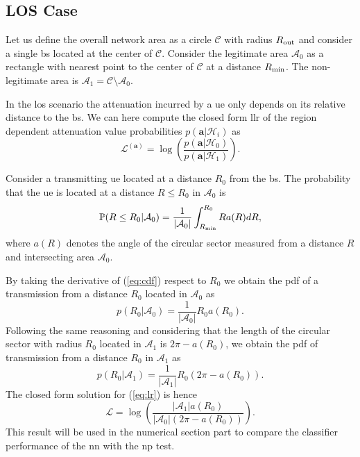\documentclass[twocolumns]{IEEEtran}
\begin{document}
\subsection{LOS Case}
Let us define the overall network area as a circle $\mathcal{C}$ with radius $R_{\rm out}$ and consider a single \ac{bs} located at the center of $\mathcal{C}$. Consider the legitimate area $\mathcal{A}_{0}$ as a rectangle with nearest point to the center of $\mathcal{C}$ at a distance $R_{\rm min}$. The non-legitimate area is $\mathcal{A}_1 = \mathcal{C} \setminus \mathcal{A}_0$.

In the \ac{los} scenario the attenuation incurred by a \ac{ue} only depends on its relative distance to the \ac{bs}. We can here compute the closed form \ac{llr} of the region dependent attenuation value probabilities $p(\bm{a}|\mathcal{H}_i)$ as
\begin{equation}\label{eq:lr}
    \mathcal{L}^{(\bm{a})}=\log\left(\frac{p(\bm{a}|\mathcal{H}_0)}{p(\bm{a}|\mathcal{H}_1)}\right).
\end{equation}

Consider a transmitting \ac{ue} located at a distance $R_0$ from the \ac{bs}. The probability that the \ac{ue} is located at a distance $R\le R_0$ in $\mathcal{A}_0$ is
\begin{equation}\label{eq:cdf}
     \mathbb{P}(R \le R_0|\mathcal{A}_0) = \frac{1}{|\mathcal{A}_0|}\int_{R_{\rm min}}^{R_0} R a(R) dR,
\end{equation}
where $a(R)$ denotes the angle of the circular sector measured from a distance $R$ and intersecting area $\mathcal{A}_0$.

By taking the derivative of (\ref{eq:cdf}) respect to $R_0$ we obtain the \ac{pdf} of a transmission from a distance $R_0$ located in $\mathcal{A}_0$ as
\begin{equation}
    p(R_0|\mathcal{A}_0) = \frac{1}{|\mathcal{A}_0|}R_0a(R_0).
\end{equation}
Following the same reasoning and considering that the length of the circular sector with radius $R_0$ located in $\mathcal{A}_1$ is $2\pi - a(R_0)$, we obtain the \ac{pdf} of transmission from a distance $R_0$ in $\mathcal{A}_1$ as
\begin{equation}
     p(R_0|\mathcal{A}_1) = \frac{1}{|\mathcal{A}_1|}R_0\left(2\pi-a(R_0)\right).
\end{equation}
The closed form solution for (\ref{eq:lr}) is hence
\begin{equation}
    \mathcal{L}=\log\left(\frac{|\mathcal{A}_1|a(R_0)}{|\mathcal{A}_0|\left(2\pi-a(R_0)\right)}\right).
\end{equation}
This result will be used in the numerical section part to compare the classifier performance of the \ac{nn} with the \ac{np} test.
\end{document}
